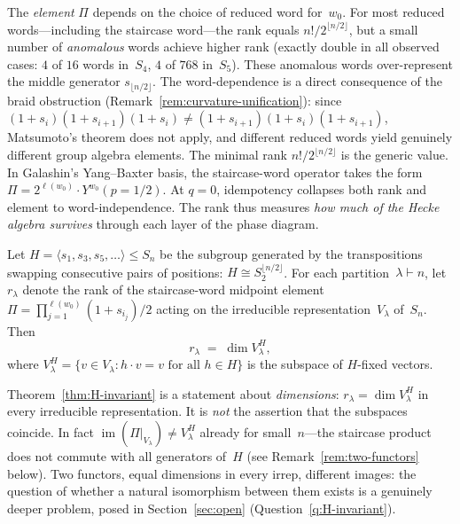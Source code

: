 \begin{remark}
The \emph{element} $\Pi$ depends on the choice of reduced word for~$w_0$.
For most reduced words---including the staircase word---the rank
equals $n!/2^{\lfloor n/2 \rfloor}$, but a small number of
\emph{anomalous} words achieve higher rank (exactly double in all
observed cases: $4$ of $16$ words in~$S_4$, $4$ of $768$ in~$S_5$).
These anomalous words over-represent the middle generator
$s_{\lfloor n/2 \rfloor}$.  The word-dependence is a direct consequence of
the braid obstruction (Remark~\ref{rem:curvature-unification}): since
$(1{+}s_i)(1{+}s_{i+1})(1{+}s_i) \neq (1{+}s_{i+1})(1{+}s_i)(1{+}s_{i+1})$,
Matsumoto's theorem does not apply, and different reduced words yield
genuinely different group algebra elements.  The minimal rank
$n!/2^{\lfloor n/2 \rfloor}$ is the generic value.
In Galashin's Yang--Baxter basis, the staircase-word operator takes the
form $\Pi = 2^{\ell(w_0)} \cdot Y^{w_0}(p = 1/2)$.
At $q = 0$, idempotency collapses both rank and element
to word-independence.  The rank thus measures \emph{how much of the
Hecke algebra survives} through each layer of the phase diagram.
\end{remark}

\begin{theorem}
\label{thm:H-invariant}
Let $H = \langle s_1, s_3, s_5, \ldots \rangle \leq S_n$ be the
subgroup generated by the transpositions swapping consecutive pairs of
positions: $H \cong S_2^{\lfloor n/2 \rfloor}$.  For each
partition~$\lambda \vdash n$, let $r_\lambda$ denote the rank of the
staircase-word midpoint element
$\Pi = \prod_{j=1}^{\ell(w_0)} (1 + s_{i_j})/2$ acting on the
irreducible representation~$V_\lambda$ of~$S_n$.  Then
\[
  r_\lambda \;=\; \dim V_\lambda^H,
\]
where $V_\lambda^H = \{v \in V_\lambda : h \cdot v = v
\text{ for all } h \in H\}$ is the subspace of $H$-fixed vectors.
\end{theorem}

\begin{remark}
\label{rem:rank-not-functor}
Theorem~\ref{thm:H-invariant} is a statement about \emph{dimensions}:
$r_\lambda = \dim V_\lambda^H$ in every irreducible representation.
It is \emph{not} the assertion that the subspaces coincide.  In fact
$\operatorname{im}(\Pi|_{V_\lambda}) \neq V_\lambda^H$ already for
small~$n$---the staircase product does not commute with all generators
of~$H$ (see Remark~\ref{rem:two-functors} below).  Two functors, equal
dimensions in every irrep, different images: the question of whether
a natural isomorphism between them exists is a genuinely deeper
problem, posed in Section~\ref{sec:open} (Question~\ref{q:H-invariant}).
\end{remark}

